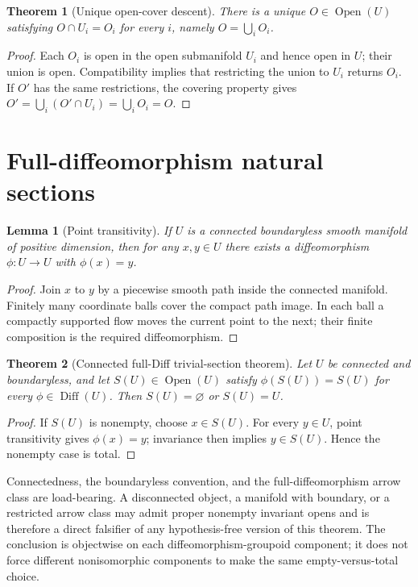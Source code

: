 \documentclass[11pt]{article}
\newtheorem{theorem}{Theorem}
\newtheorem{lemma}{Lemma}
\begin{document}
\begin{theorem}[Unique open-cover descent]
There is a unique $O\in\operatorname{Open}(U)$ satisfying
$O\cap U_i=O_i$ for every $i$, namely $O=\bigcup_i O_i$.
\end{theorem}

\begin{proof}
Each $O_i$ is open in the open submanifold $U_i$ and hence open in $U$; their
union is open.  Compatibility implies that restricting the union to $U_i$
returns $O_i$.  If $O'$ has the same restrictions, the covering property gives
$O'=\bigcup_i(O'\cap U_i)=\bigcup_iO_i=O$.
\end{proof}

\section{Full-diffeomorphism natural sections}

\begin{lemma}[Point transitivity]
If $U$ is a connected boundaryless smooth manifold of positive dimension, then for any
$x,y\in U$ there exists a diffeomorphism $\phi:U\to U$ with $\phi(x)=y$.
\end{lemma}

\begin{proof}
Join $x$ to $y$ by a piecewise smooth path inside the connected manifold.
Finitely many coordinate balls cover the compact path image.  In each ball a
compactly supported flow moves the current point to the next; their finite
composition is the required diffeomorphism.
\end{proof}

\begin{theorem}[Connected full-Diff trivial-section theorem]
Let $U$ be connected and boundaryless, and let $S(U)\in\operatorname{Open}(U)$ satisfy
$\phi(S(U))=S(U)$ for every $\phi\in\operatorname{Diff}(U)$.  Then
$S(U)=\varnothing$ or $S(U)=U$.
\end{theorem}

\begin{proof}
If $S(U)$ is nonempty, choose $x\in S(U)$.  For every $y\in U$, point
transitivity gives $\phi(x)=y$; invariance then implies $y\in S(U)$.  Hence the
nonempty case is total.
\end{proof}

Connectedness, the boundaryless convention, and the full-diffeomorphism arrow
class are load-bearing.  A disconnected object, a manifold with boundary, or a
restricted arrow class may admit proper nonempty invariant opens and is
therefore a direct falsifier of any hypothesis-free version of this theorem.
The conclusion is objectwise on each diffeomorphism-groupoid component; it does
not force different nonisomorphic components to make the same empty-versus-total
choice.
\end{document}

